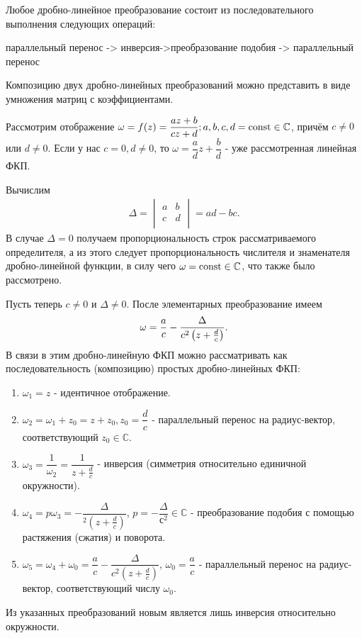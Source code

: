 \begin{plan}
\item Любое дробно-линейное преобразование состоит из последовательного выполнения следующих
  операций:

  параллельный перенос -> инверсия->преобразование подобия -> параллельный перенос
\item Композицию двух дробно-линейных преобразований можно представить в виде умножения матриц с
  коэффициентами.
\end{plan}

\begin{col-answer-preambule}
\end{col-answer-preambule}
Рассмотрим отображение $\omega = f(z) = \dfrac{az + b}{cz + d}; a, b, c, d = \operatorname{\text{const}} \in \mathbb{C}$,
причём $c \neq 0$ или $d \neq 0$. Если у нас $c = 0, d \neq 0$, то
$\omega = \dfrac{a}{d}z + \dfrac{b}{d}$ - уже рассмотренная линейная ФКП.

Вычислим
\begin{align*}
  \Delta =
  \begin{vmatrix}
    a & b\\
    c & d\\
  \end{vmatrix}
  = ad - bc.
\end{align*}
В случае $\Delta = 0$ получаем пропорциональность строк рассматриваемого определителя, а из этого
следует пропорциональность числителя и знаменателя дробно-линейной функции, в силу чего
$\omega = \operatorname{\text{const}} \in \mathbb{C}$, что также было рассмотрено.

Пусть теперь $c \neq 0$ и $\Delta \neq 0$. После элементарных преобразование имеем
\begin{align*}
  \omega = \dfrac{a}{c} - \dfrac{\Delta}{c^2\left( z + \frac{d}{c} \right)}.
\end{align*}
В связи в этим дробно-линейную ФКП можно рассматривать как последовательность (композицию)
простых дробно-линейных ФКП:
\begin{enumerate}
\item $\omega_1 = z$ - идентичное отображение.
\item $\omega_2 = \omega_1 + z_0 = z + z_0, z_0 = \dfrac{d}{c}$ - параллельный перенос на
  радиус-вектор, соответствующий $z_0 \in \mathbb{C}$.
\item $\omega_3 = \dfrac{1}{\omega_2} = \dfrac{1}{z + \frac{d}{c}}$ - инверсия (симметрия
  относительно единичной окружности).
\item $\omega_4 = p\omega_3 = -\dfrac{\Delta}{^2(z + \frac{d}{c})}$,
  ${p = -\dfrac{\Delta}{с^2} \in \mathbb{C}}$ - преобразование подобия с помощью растяжения
  (сжатия) и поворота.
\item $\omega_5 = \omega_4 + \omega_0 = \dfrac{a}{c} - \dfrac{\Delta}{c^2(z + \frac{d}{c})}$,
  $\omega_0 = \dfrac{a}{c}$ - параллельный перенос на радиус-вектор, соответствующий числу
  $\omega_0$.
\end{enumerate}
Из указанных преобразований новым является лишь инверсия относительно окружности.

